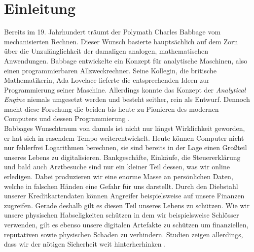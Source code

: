 \documentclass[
    12pt, %
    DIV10,
    ngerman, %
    a4paper, %
    oneside, %
    titlepage, %
    parskip=half, %
    headings=normal, %
    listof=totoc, %
    bibliography=totoc, %
    index=totoc, %
    captions=tableheading, %
    final %
]{scrreprt}
\begin{document}
\newpage
{}
\chapter{Einleitung}
Bereits im 19. Jahrhundert träumt der Polymath Charles Babbage vom mechanisierten Rechnen. Dieser Wunsch basierte hauptsächlich auf dem Zorn über die Unzulänglichkeit der damaligen analogen, mathematischen Anwendungen. Babbage entwickelte ein Konzept für analytische Maschinen, also einen programmierbaren Allzweckrechner. Seine Kollegin, die britische Mathematikerin, Ada Lovelace lieferte die entsprechenden Ideen zur Programmierung seiner Maschine. Allerdings konnte das Konzept der \emph{Analytical Engine} niemals umgesetzt werden und besteht seither, rein als Entwurf. Dennoch macht diese Forschung die beiden bis heute zu Pionieren des modernen Computers und dessen Programmierung \parencite{wilkes1995computing}.\\
Babbages Wunschtraum von damals ist nicht nur längst Wirklichkeit geworden, er hat sich in rasendem Tempo weiterentwickelt. Heute können Computer nicht nur fehlerfrei Logarithmen berechnen, sie sind bereits in der Lage einen Gro{\ss}teil unseres Lebens zu digitalisieren. Bankgeschäfte, Einkäufe, die Steuererklärung und bald auch Arztbesuche sind nur ein kleiner Teil dessen, was wir online erledigen. Dabei produzieren wir eine enorme Masse an persönlichen Daten, welche in falschen Händen eine Gefahr für uns darstellt. Durch den Diebstahl unserer Kreditkartendaten können Angreifer beispielsweise auf unsere Finanzen zugreifen. Gerade deshalb gilt es diesen Teil unseres Lebens zu schützen. Wie wir unsere physischen Habseligkeiten schützen in dem wir beispielsweise Schlösser verwenden, gilt es ebenso unsere digitalen Artefakte zu schützen um finanziellen, reputativen sowie physischen Schaden zu verhindern. Studien zeigen allerdings, dass wir der nötigen Sicherheit weit hinterherhinken \parencite{Microsoft2019}. 
\end{document}
